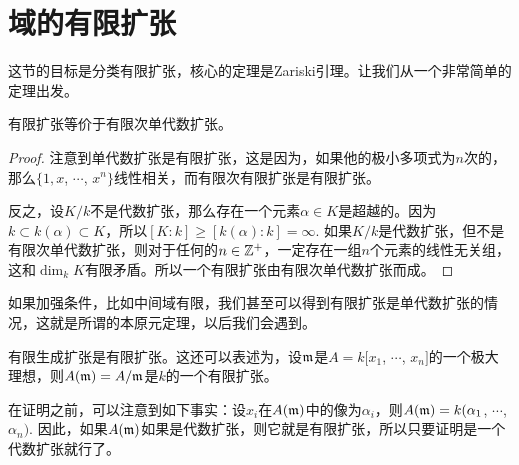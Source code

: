 \section{域的有限扩张}

这节的目标是分类有限扩张，核心的定理是Zariski引理。让我们从一个非常简单的定理出发。

\begin{pro}
有限扩张等价于有限次单代数扩张。
\end{pro}

\begin{proof} 注意到单代数扩张是有限扩张，这是因为，如果他的极小多项式为$n$次的，那么$\{1,x$, $\cdots$, $x^n\}$线性相关，而有限次有限扩张是有限扩张。

反之，设$K/k$不是代数扩张，那么存在一个元素$\alpha\in K$是超越的。因为$k\subset k(\alpha)\subset K$，所以$[K:k]\geq [k(\alpha):k]=\infty$. 如果$K/k$是代数扩张，但不是有限次单代数扩张，则对于任何的$n\in \mathbb{Z}^+$，一定存在一组$n$个元素的线性无关组，这和$\dim_k K$有限矛盾。所以一个有限扩张由有限次单代数扩张而成。\end{proof}

如果加强条件，比如中间域有限，我们甚至可以得到有限扩张是单代数扩张的情况，这就是所谓的本原元定理，以后我们会遇到。

\begin{thm}[Zariski引理]
有限生成扩张是有限扩张。这还可以表述为，设$\mathfrak{m}$是$A=k[x_1$, $\cdots$, $x_n]$的一个极大理想，则$A(\mathfrak{m})=A/\mathfrak{m}$是$k$的一个有限扩张。
\end{thm}

在证明之前，可以注意到如下事实：设$x_i$在$A(\mathfrak{m})$中的像为$\alpha_i$，则$A(\mathfrak{m})=k(\alpha_1$, $\cdots$, $\alpha_n)$. 因此，如果$A(\mathfrak{m})$如果是代数扩张，则它就是有限扩张，所以只要证明是一个代数扩张就行了。

